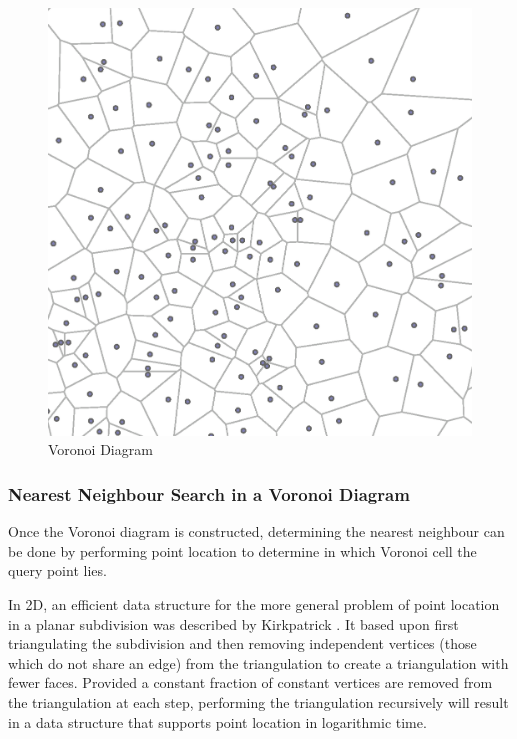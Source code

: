 \documentclass[mcs]{scsthesis}
\begin{document}
\begin{figure}
\begin{center}
\includegraphics[scale=0.5]{diagrams/voronoi.eps}
\caption{Voronoi Diagram}
\label{fig:voronoi_diagram}
\end{center}
\end{figure}

\subsubsection{Nearest Neighbour Search in a Voronoi Diagram}

Once the Voronoi diagram is constructed, determining the nearest neighbour can
be done by performing point location to determine in which Voronoi cell the
query point lies.

In 2D, an efficient data structure for the more general problem of point
location in a planar subdivision was described by Kirkpatrick
\cite{kirkpatrick}. It based upon first triangulating the subdivision and then
removing independent vertices (those which do not share an edge) from the
triangulation to create a triangulation with fewer faces. Provided a constant
fraction of constant vertices are removed from the triangulation at each step,
performing the triangulation recursively will result in a data structure that
supports point location in logarithmic time.
\end{document}
